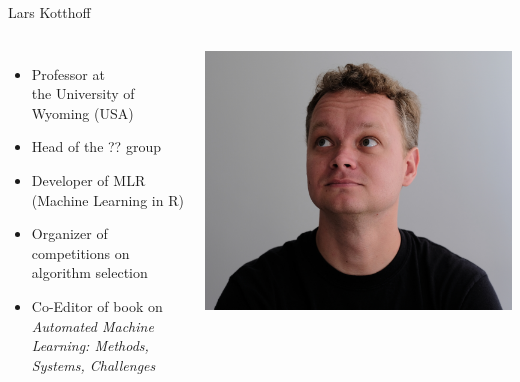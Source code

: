 \begin{frame}[c]{Lars Kotthoff}

\begin{columns}
	
	
	\begin{itemize}
		\item Professor at\\ the University of Wyoming (USA)
		\item Head of the ?? group
		\item Developer of MLR (Machine Learning in R)
		\item Organizer of competitions on algorithm selection
    	\item Co-Editor of book on \textit{Automated Machine Learning:	Methods, Systems, Challenges}
	\end{itemize}
	
	
	\includegraphics[width=1.0\textwidth]{images/kotthoff.jpg}
	
\end{columns}

\end{frame}
